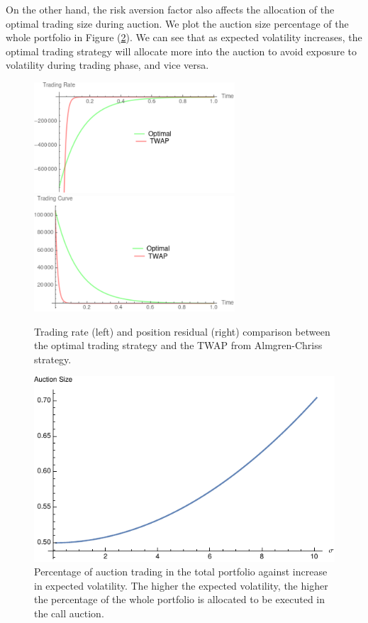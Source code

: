 {On the other hand, the risk aversion factor also affects the allocation of the optimal trading size during auction. We plot the auction size percentage of the whole portfolio in Figure (\ref{fig:auction_size_pct}). We can see that as expected volatility increases, the optimal trading strategy will allocate more into the auction to avoid exposure to volatility during trading phase, and vice versa.

\begin{figure}
	\centering
	\includegraphics[width=7.5cm]{images/ContinuousTradingRate}
	\includegraphics[width=7.5cm]{images/ContinuousTradingCurve}
	\caption{Trading rate (left) and position residual (right) comparison between the optimal trading strategy and the TWAP from Almgren-Chriss strategy. }
	\label{fig:trading_rate_comparison}
\end{figure}
\begin{figure}
	\centering
	\includegraphics[width=15cm]{images/AuctionSizePct}
	\caption{Percentage of auction trading in the total portfolio against increase in expected volatility. The higher the expected volatility, the higher the percentage of the whole portfolio is allocated to be executed in the call auction.}
	\label{fig:auction_size_pct}
\end{figure}
}
